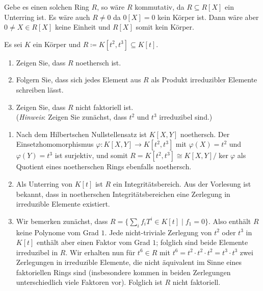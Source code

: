 \begin{solution}
  Gebe es einen solchen Ring $R$, so wäre $R$ kommutativ, da $R \subseteq R[X]$ ein Unterring ist.
  Es wäre auch $R \neq 0$ da $0[X] = 0$ kein Körper ist.
  Dann wäre aber $0 \neq X \in R[X]$ keine Einheit und $R[X]$ somit kein Körper.
\end{solution}


\begin{question}[subtitle = Ein nicht-faktorieller Ring]
  Es sei $K$ ein Körper und $R \coloneqq K[t^2, t^3] \subseteq K[t]$.
  \begin{enumerate}
    \item
      Zeigen Sie, dass $R$ noethersch ist.
    \item
      Folgern Sie, dass sich jedes Element aus $R$ als Produkt irreduzibler Elemente schreiben lässt.
    \item
      Zeigen Sie, dass $R$ nicht faktoriell ist.
      \\
      (\emph{Hinweis}:
       Zeigen Sie zunächst, dass $t^2$ und $t^3$ irreduzibel sind.)
  \end{enumerate}
\end{question}


\begin{solution}
  \begin{enumerate}
    \item
      Nach dem Hilbertschen Nullstellensatz ist $K[X,Y]$ noethersch.
      Der Einsetzhomomorphismus $\varphi \colon K[X,Y] \to K[t^2, t^3]$ mit $\varphi(X) = t^2$ und $\varphi(Y) = t^3$ ist surjektiv, und somit $R = K[t^2, t^3] \cong K[X,Y]/\ker \varphi$ als Quotient eines noetherschen Rings ebenfalls noethersch.
    \item
      Als Unterring von $K[t]$ ist $R$ ein Integritätsbereich.
      Aus der Vorlesung ist bekannt, dass in noetherschen Integritätsbereichen eine Zerlegung in irreduzible Elemente existiert.
    \item
      Wir bemerken zunächst, dass $R = \{\sum_i f_i T^i \in K[t] \mid f_1 = 0\}$.
      Also enthält $R$ keine Polynome vom Grad $1$.
      Jede nicht-triviale Zerlegung von $t^2$ oder $t^3$ in $K[t]$ enthält aber einen Faktor vom Grad $1$;
      folglich sind beide Elemente irreduzibel in $R$.
      Wir erhalten nun für $t^6 \in R$ mit $t^6 = t^2 \cdot t^2 \cdot t^2 = t^3 \cdot t^3$ zwei Zerlegungen in irreduzible Elemente, die nicht äquivalent im Sinne eines faktoriellen Rings sind (insbesondere kommen in beiden Zerlegungen unterschiedlich viele Faktoren vor).
      Folglich ist $R$ nicht faktoriell.
  \end{enumerate}
\end{solution}


